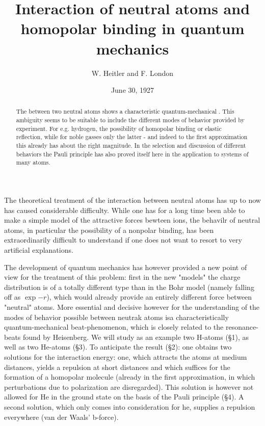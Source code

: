 \documentclass{article}
\title{Interaction of neutral atoms and homopolar binding in quantum mechanics}
\author{W. Heitler and F. London}
\date{June 30, 1927}
\begin{document}
\maketitle

\begin{abstract}
The  between two neutral atoms shows a characteristic quantum-mechanical . This ambiguity seems to be suitable to include the different modes of behavior provided by experiment. For e.g. hydrogen, the possibility of homopolar binding or elastic reflection, while for noble gasses only the latter - and indeed to the first approximation this already has about the right magnitude. In the selection and discussion of different behaviors the Pauli principle has also proved itself here in the application to systems of many atoms.
\end{abstract}

The theoretical treatment of the interaction between neutral atoms has up to now has caused considerable difficulty. While one has for a long time been able to make a simple model of the attractive forces bewteen ions, the behavilr of neutral atoms, in particular the possibility of a nonpolar binding, has been extraordinarily difficult to understand if one does not want to resort to very artificial explanations.

The development of quantum mechanics has however provided a new point of view for the treatment of this problem: first in the new "models" the charge distribution is of a totally different type than in the Bohr model (namely falling off as $\exp{-r}$), which would already provide an entirely different force between "neutral" atoms. More essential and decisive however for the understanding of the modes of behavior possible between neutrak atoms isa characteristically quantum-mechanical beat-phenomenon, which is closely related to the resonance-beats found by Heisenberg. We will study as an example two H-atoms (§1), as well as two He-atoms (§3). To anticipate the result (§2): one obtains two solutions for the interaction energy: one, which attracts the atoms at medium distances, yields a repulsion at short distances and which suffices for the formation of a homopolar molecule (already in the first approximation, in which perturbations due to polarization are disregarded). This solution is however not allowed for He in the ground state on the basis of the Pauli principle (§4). A second solution, which only comes into consideration for he, supplies a repulsion everywhere (van der Waals' b-force).
\end{document}
